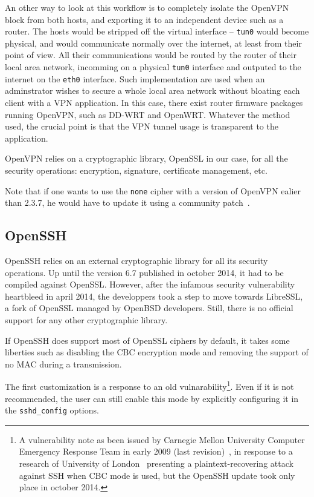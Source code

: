 An other way to look at this workflow is to completely isolate the OpenVPN block from both hosts, and exporting it to an independent device such as a router.
The hosts would be stripped off the virtual interface -- \texttt{tun0} would become physical, and would communicate normally over the internet, at least from their point of view.
All their communications would be routed by the router of their local area network, incomming on a physical \texttt{tun0} interface and outputed to the internet on the \texttt{eth0} interface.
Such implementation are used when an adminstrator wishes to secure a whole local area network without bloating each client with a VPN application.
In this case, there exist router firmware packages running OpenVPN, such as DD-WRT and OpenWRT.
Whatever the method used, the crucial point is that the VPN tunnel usage is transparent to the application.\newline{}

OpenVPN relies on a cryptographic library, OpenSSL in our case, for all the security operations: encryption, signature, certificate management, etc.

\noindent Note that if one wants to use the \texttt{none} cipher with a version of OpenVPN ealier than 2.3.7, he would have to update it using a community patch~\cite{openvpn-patch-none}.


\subsection{OpenSSH}
OpenSSH relies on an external cryptographic library for all its security operations.
Up until the version 6.7 published in october 2014, it had to be compiled against OpenSSL.
However, after the infamous security vulnerability heartbleed in april 2014, the developpers took a step to move towards LibreSSL, a fork of OpenSSL managed by OpenBSD  developers.
Still, there is no official support for any other cryptographic library.

If OpenSSH does support most of OpenSSL ciphers by default, it takes some liberties such as disabling the CBC encryption mode and removing the support of no MAC during a transmission.

\noindent The first customization is a response to an old vulnarability\footnote{A vulnerability note as been issued by Carnegie Mellon University Computer Emergency Response Team in early 2009 (last revision)~\cite{CERT2009}, in response to a research of University of London~\cite{Albrecht:2009} presenting a plaintext-recovering attack against SSH when CBC mode is used, but the OpenSSH update took only place in october 2014.}.
Even if it is not recommended, the user can still enable this mode by explicitly configuring it in the \texttt{sshd\_config} options.

